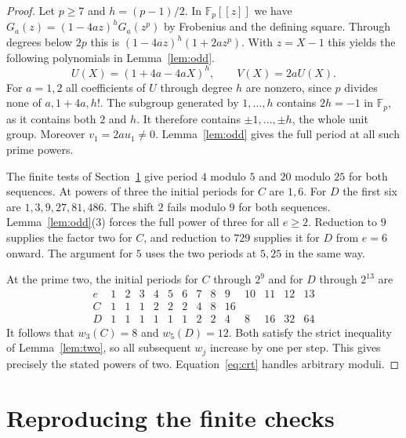 \documentclass[11pt,letterpaper]{article}
\newcommand{\FF}{\mathbb F}
\begin{document}
\begin{proof}
Let $p\ge7$ and $h=(p-1)/2$. In $\FF_p[[z]]$ we have
$G_a(z)=(1-4az)^hG_a(z^p)$ by Frobenius and the defining square.
Through degrees below $2p$ this is $(1-4az)^h(1+2az^p)$. With $z=X-1$ this
yields the following polynomials in Lemma~\ref{lem:odd}.
\[
 U(X)=(1+4a-4aX)^h,\qquad V(X)=2aU(X).
\]
For $a=1,2$ all coefficients of $U$ through degree $h$ are nonzero, since
$p$ divides none of $a,1+4a,h!$. The subgroup generated by $1,\ldots,h$
contains $2h=-1$ in $\FF_p$, as it contains both $2$ and $h$. It therefore
contains $\pm1,\ldots,\pm h$, the whole unit group. Moreover $v_1=2au_1\ne0$.
Lemma~\ref{lem:odd} gives the full period at all such prime powers.

The finite tests of Section~\ref{sec:cert} give period $4$ modulo $5$
and $20$ modulo $25$ for both sequences. At powers of three the initial
periods for $C$ are $1,6$. For $D$ the first six are
$1,3,9,27,81,486$. The shift $2$ fails modulo $9$ for both sequences.
Lemma~\ref{lem:odd}(3) forces the full power of three for all $e\ge2$.
Reduction to $9$ supplies the factor two for $C$, and reduction to $729$
supplies it for $D$ from $e=6$ onward. The argument for $5$ uses the
two periods at $5,25$ in the same way.

At the prime two, the initial periods for $C$ through $2^9$ and for
$D$ through $2^{13}$ are
\[
\begin{array}{c|rrrrrrrrrrrrr}
e&1&2&3&4&5&6&7&8&9&10&11&12&13\\\hline
C&1&1&1&2&2&2&4&8&16&&&&\\
D&1&1&1&1&1&1&2&2&4&8&16&32&64
\end{array}
\]
It follows that $w_3(C)=8$ and $w_5(D)=12$. Both satisfy the strict
inequality of Lemma~\ref{lem:two}, so all subsequent $w_j$ increase by one
per step. This gives precisely the stated powers of two. Equation~\eqref{eq:crt}
handles arbitrary moduli.
\end{proof}

\clearpage
\section{Reproducing the finite checks}\label{sec:cert}
\end{document}
